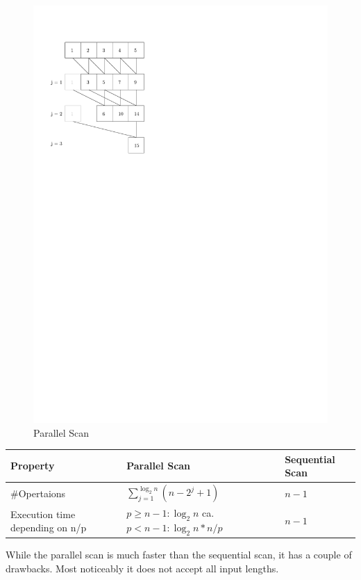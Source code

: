 \documentclass[a4paper,twoside,11pt]{article}
\begin{document}
\begin{figure}[hbtp]
\centering
\label{fig:para_algo}
\includegraphics[scale=1]{algo}
\caption{Parallel Scan}
\end{figure}

\begin{tabular}{|p{3cm}|p{6cm}|l|}
\hline
Property&Parallel Scan& Sequential Scan\\
\hline
\hline
\#Opertaions& $\sum\limits_{j=1}^{\log_2n}(n-2^j+1)$& $n-1$\\
\hline

Execution time depending on n/p & $p \ge n -1 : \log_2n$ \newline ca.  $p < n -1 : \log_2n * n/p$& $n-1$\\
\hline

\end{tabular}

While the parallel scan is much faster than the sequential scan, it has  a couple of drawbacks. Most noticeably it does not accept all input lengths.
\end{document}
